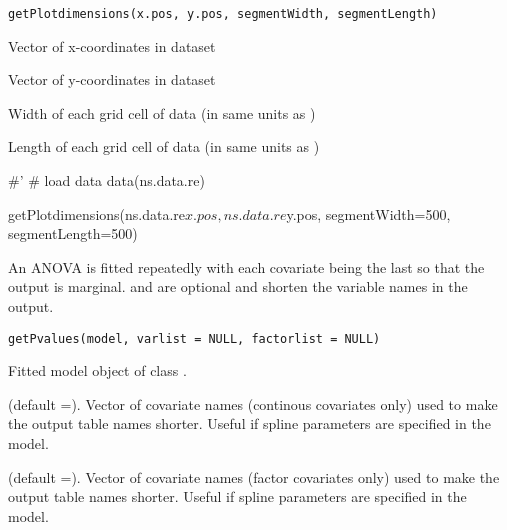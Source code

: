 \documentclass[a4paper]{book}
\begin{document}
%
\begin{Usage}
\begin{verbatim}
getPlotdimensions(x.pos, y.pos, segmentWidth, segmentLength)
\end{verbatim}
\end{Usage}
%
\begin{Arguments}
\begin{ldescription}
\item[\code{x.pos}] Vector of x-coordinates in dataset

\item[\code{y.pos}] Vector of y-coordinates in dataset

\item[\code{segmentWidth}] Width of each grid cell of data (in same units as )

\item[\code{segmentLength}] Length of each grid cell of data (in same units as )
\end{ldescription}
\end{Arguments}
%
\begin{Examples}
\begin{ExampleCode}
#' # load data
data(ns.data.re)

getPlotdimensions(ns.data.re$x.pos, ns.data.re$y.pos, segmentWidth=500, segmentLength=500)

\end{ExampleCode}
\end{Examples}
%
\begin{Description}\relax
An ANOVA is fitted repeatedly with each covariate being the last so that the output is marginal.   and  are optional and shorten the variable names in the output.
\end{Description}
%
\begin{Usage}
\begin{verbatim}
getPvalues(model, varlist = NULL, factorlist = NULL)
\end{verbatim}
\end{Usage}
%
\begin{Arguments}
\begin{ldescription}
\item[\code{model}] Fitted model object of class .

\item[\code{varlist}] (default =). Vector of covariate names (continous covariates only) used to make the output table names shorter.  Useful if spline parameters are specified in the model.

\item[\code{factorlist}] (default =). Vector of covariate names (factor covariates only) used to make the output table names shorter. Useful if spline parameters are specified in the model.
\end{ldescription}
\end{Arguments}
\end{document}

